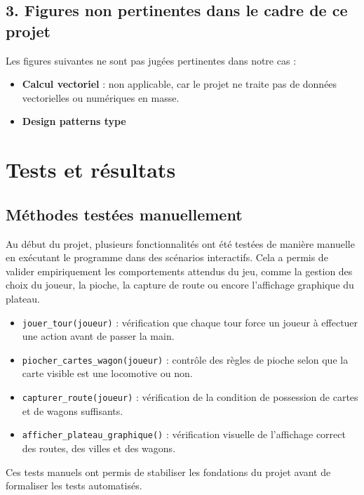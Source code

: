 \documentclass[a4paper,12pt]{report}
\begin{document}
\section*{3. Figures non pertinentes dans le cadre de ce projet}

Les figures suivantes ne sont pas jugées pertinentes dans notre cas :

\begin{itemize}
    \item \textbf{Calcul vectoriel} : non applicable, car le projet ne traite pas de données vectorielles ou
    numériques en masse.
    \item \textbf{Design patterns type}

\end{itemize}

\chapter{Tests et résultats}

\section{Méthodes testées manuellement}

Au début du projet, plusieurs fonctionnalités ont été testées de manière manuelle en exécutant le programme dans des
scénarios interactifs. Cela a permis de valider empiriquement les comportements attendus du jeu, comme la gestion des
choix du joueur, la pioche, la capture de route ou encore l’affichage graphique du plateau.

\begin{itemize}
    \item \texttt{jouer\_tour(joueur)} : vérification que chaque tour force un joueur à effectuer une action avant de passer la main.
    \item \texttt{piocher\_cartes\_wagon(joueur)} : contrôle des règles de pioche selon que la carte visible est une locomotive ou non.
    \item \texttt{capturer\_route(joueur)} : vérification de la condition de possession de cartes et de wagons suffisants.
    \item \texttt{afficher\_plateau\_graphique()} : vérification visuelle de l'affichage correct des routes, des villes et des wagons.
\end{itemize}

Ces tests manuels ont permis de stabiliser les fondations du projet avant de formaliser les tests automatisés.
\end{document}
